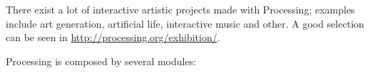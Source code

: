 {There exist a lot of interactive artistic projects made with
Processing; examples include art generation, artificial life,
interactive music and other. A good selection can be seen in
\url{http://processing.org/exhibition/}. %

Processing is composed by several modules: %


}
